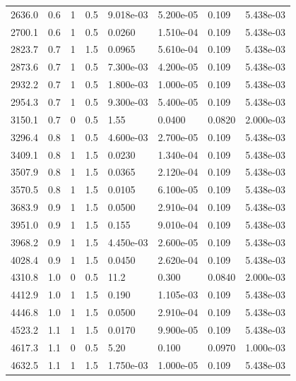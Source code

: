 \documentclass[preview]{standalone}
\begin{document}
{{\begin{tabular}{L{1.2cm}C{1.2cm} C{0.3cm}C{0.5cm} C{1.4cm}C{1.4cm} C{1.4cm}C{1.4cm}}
  2636.0  &   0.6  & 1     & 0.5 &  9.018e-03  & 5.200e-05  & 0.109 &  5.438e-03   \\ 
  2700.1  &   0.6  & 1     & 0.5 &  0.0260  & 1.510e-04  & 0.109 &  5.438e-03   \\ 
  2823.7  &   0.7  & 1     & 1.5 &  0.0965  & 5.610e-04  & 0.109 &  5.438e-03   \\ 
  2873.6  &   0.7  & 1     & 0.5 &  7.300e-03  & 4.200e-05  & 0.109 &  5.438e-03   \\ 
  2932.2  &   0.7  & 1     & 0.5 &  1.800e-03  & 1.000e-05  & 0.109 &  5.438e-03   \\ 
  2954.3  &   0.7  & 1     & 0.5 &  9.300e-03  & 5.400e-05  & 0.109 &  5.438e-03   \\ 
  3150.1  &   0.7  & 0     & 0.5 &  1.55  & 0.0400  & 0.0820 &  2.000e-03   \\ 
  3296.4  &   0.8  & 1     & 0.5 &  4.600e-03  & 2.700e-05  & 0.109 &  5.438e-03   \\ 
  3409.1  &   0.8  & 1     & 1.5 &  0.0230  & 1.340e-04  & 0.109 &  5.438e-03   \\ 
  3507.9  &   0.8  & 1     & 1.5 &  0.0365  & 2.120e-04  & 0.109 &  5.438e-03   \\ 
  3570.5  &   0.8  & 1     & 1.5 &  0.0105  & 6.100e-05  & 0.109 &  5.438e-03   \\ 
  3683.9  &   0.9  & 1     & 1.5 &  0.0500  & 2.910e-04  & 0.109 &  5.438e-03   \\ 
  3951.0  &   0.9  & 1     & 1.5 &  0.155  & 9.010e-04  & 0.109 &  5.438e-03   \\ 
  3968.2  &   0.9  & 1     & 1.5 &  4.450e-03  & 2.600e-05  & 0.109 &  5.438e-03   \\ 
  4028.4  &   0.9  & 1     & 1.5 &  0.0450  & 2.620e-04  & 0.109 &  5.438e-03   \\ 
  4310.8  &   1.0  & 0     & 0.5 &  11.2  & 0.300  & 0.0840 &  2.000e-03   \\ 
  4412.9  &   1.0  & 1     & 1.5 &  0.190  & 1.105e-03  & 0.109 &  5.438e-03   \\ 
  4446.8  &   1.0  & 1     & 1.5 &  0.0500  & 2.910e-04  & 0.109 &  5.438e-03   \\ 
  4523.2  &   1.1  & 1     & 1.5 &  0.0170  & 9.900e-05  & 0.109 &  5.438e-03   \\ 
  4617.3  &   1.1  & 0     & 0.5 &  5.20  & 0.100  & 0.0970 &  1.000e-03   \\ 
  4632.5  &   1.1  & 1     & 1.5 &  1.750e-03  & 1.000e-05  & 0.109 &  5.438e-03   \\ 

\end{tabular}}}
\end{document}
